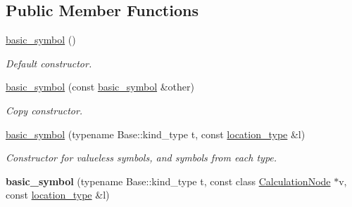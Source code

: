 \subsection*{Public Member Functions}
\begin{DoxyCompactItemize}
\item 
\hyperlink{structEquationParser_1_1Parser_1_1basic__symbol_a7cc26057f5a4fe2232f39c0880ccab0c}{basic\+\_\+symbol} ()\hypertarget{structEquationParser_1_1Parser_1_1basic__symbol_a7cc26057f5a4fe2232f39c0880ccab0c}{}\label{structEquationParser_1_1Parser_1_1basic__symbol_a7cc26057f5a4fe2232f39c0880ccab0c}

\begin{DoxyCompactList}\small\item\em Default constructor. \end{DoxyCompactList}\item 
\hyperlink{structEquationParser_1_1Parser_1_1basic__symbol_aa4f69c5693e9d05ef7ce655f2903dd26}{basic\+\_\+symbol} (const \hyperlink{structEquationParser_1_1Parser_1_1basic__symbol}{basic\+\_\+symbol} \&other)\hypertarget{structEquationParser_1_1Parser_1_1basic__symbol_aa4f69c5693e9d05ef7ce655f2903dd26}{}\label{structEquationParser_1_1Parser_1_1basic__symbol_aa4f69c5693e9d05ef7ce655f2903dd26}

\begin{DoxyCompactList}\small\item\em Copy constructor. \end{DoxyCompactList}\item 
\hyperlink{structEquationParser_1_1Parser_1_1basic__symbol_a3fafc195e2a9279615f90d200cdcf007}{basic\+\_\+symbol} (typename Base\+::kind\+\_\+type t, const \hyperlink{classEquationParser_1_1Parser_a9c08ca33906dfb521b4ec5989e3620bf}{location\+\_\+type} \&l)\hypertarget{structEquationParser_1_1Parser_1_1basic__symbol_a3fafc195e2a9279615f90d200cdcf007}{}\label{structEquationParser_1_1Parser_1_1basic__symbol_a3fafc195e2a9279615f90d200cdcf007}

\begin{DoxyCompactList}\small\item\em Constructor for valueless symbols, and symbols from each type. \end{DoxyCompactList}\item 
{\bfseries basic\+\_\+symbol} (typename Base\+::kind\+\_\+type t, const class \hyperlink{classCalculationNode}{Calculation\+Node} $\ast$v, const \hyperlink{classEquationParser_1_1Parser_a9c08ca33906dfb521b4ec5989e3620bf}{location\+\_\+type} \&l)\hypertarget{structEquationParser_1_1Parser_1_1basic__symbol_ade1fd985fd00a788ecd9b38247a5681b}{}\label{structEquationParser_1_1Parser_1_1basic__symbol_ade1fd985fd00a788ecd9b38247a5681b}


\end{DoxyCompactItemize}

